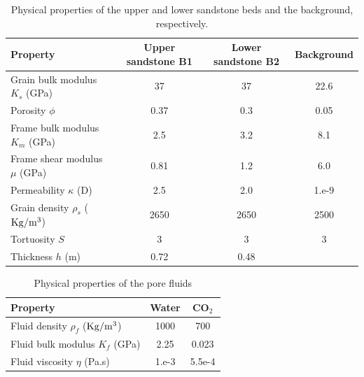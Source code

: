 \documentclass[draft]{agujournal2019}
\begin{document}
\begin{table}[!ht]
  \caption{Physical properties of the upper and lower sandstone beds and the background, respectively. }
\begin{center}
  \begin{tabular}{ | l  c  c c | }
    \hline
    Property & Upper sandstone B1 & Lower
     sandstone B2 & Background  \\ \hline
    Grain bulk modulus $K_s$ (\rm{GPa}) & 37 & 37 & 22.6 \\ 
    Porosity $\phi$ & 0.37 & 0.3 & 0.05  \\ 
    Frame bulk modulus $K_m$ (GPa) & 2.5  & 3.2 & 8.1\\ 
    Frame shear modulus $\mu$ (GPa) & 0.81  & 1.2 & 6.0 \\
    Permeability $\kappa$ (D) & 2.5 & 2.0 & 1.e-9 \\
    Grain density $\rho_s$ ($\rm{Kg/m^3}$) &2650 & 2650 & 2500\\ 
    Tortuosity $S$ & 3 & 3 & 3\\
    Thickness $h$ (m) & 0.72 & 0.48 & \\ 
                                       
    \hline
  \end{tabular}
  \label{table.1}
\end{center}
\end{table}

\begin{table}[!ht]
  \caption{Physical properties of the pore fluids}
\begin{center}
  \begin{tabular}{ | l | c | c |  }
    \hline
    Property & Water & CO$_2$\\ \hline
    Fluid density $\rho_f$ ($\rm{Kg/m^3}$) & 1000 & 700\\
    Fluid bulk modulus $K_f$ (\rm{GPa}) & 2.25 & 0.023\\
    Fluid viscosity $\eta$ (\rm{Pa.s})& 1.e-3 & 5.5e-4\\
    \hline
  \end{tabular}
  \label{table.2}
\end{center}
\end{table}
\end{document}
